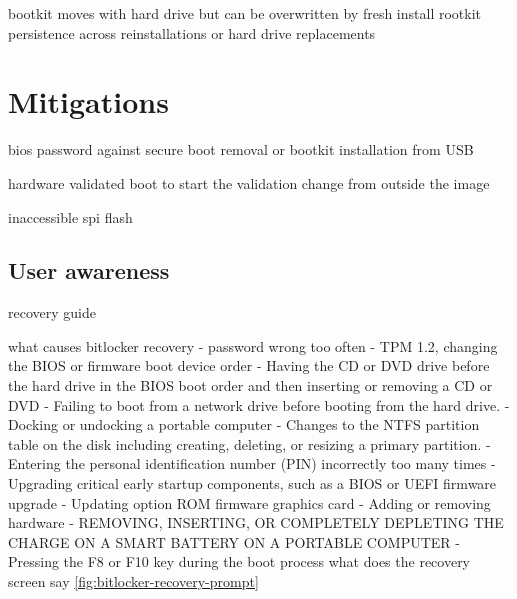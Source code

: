 
bootkit moves with hard drive but can be overwritten by fresh install
rootkit persistence across reinstallations or hard drive replacements







\section{Mitigations}


bios password against secure boot removal or bootkit installation from USB

hardware validated boot to start the validation change from outside the image

inaccessible spi flash


\subsection{User awareness}




recovery guide

what causes bitlocker recovery
- password wrong too often
- TPM 1.2, changing the BIOS or firmware boot device order
- Having the CD or DVD drive before the hard drive in the BIOS boot order and then inserting or removing a CD or DVD
- Failing to boot from a network drive before booting from the hard drive.
- Docking or undocking a portable computer
- Changes to the NTFS partition table on the disk including creating, deleting, or resizing a primary partition.
- Entering the personal identification number (PIN) incorrectly too many times
- Upgrading critical early startup components, such as a BIOS or UEFI firmware upgrade
- Updating option ROM firmware graphics card
- Adding or removing hardware
- REMOVING, INSERTING, OR COMPLETELY DEPLETING THE CHARGE ON A SMART BATTERY ON A PORTABLE COMPUTER
- Pressing the F8 or F10 key during the boot process
what does the recovery screen say \autoref{fig:bitlocker-recovery-prompt}

